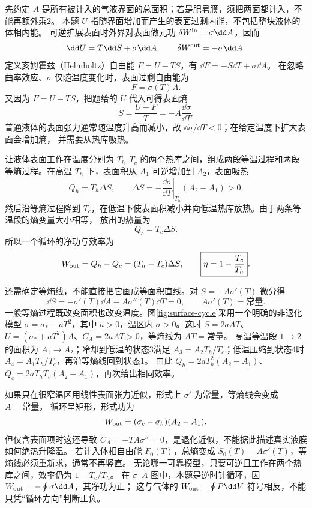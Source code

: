 \begin{xesolution}
先约定 $A$ 是所有被计入的气液界面的总面积；若是肥皂膜，须把两面都计入，不能再额外乘2。
本题 $U$ 指随界面增加而产生的表面过剩内能，不包括整块液体的体相内能。
可逆扩展表面时外界对表面做元功 $\delta W^{\rm in}=\sigma\dd A$，因而
\[
 \dd U=T\dd S+\sigma\dd A,\qquad
 \delta W^{\rm out}=-\sigma\dd A.
\]
定义亥姆霍兹（Helmholtz）自由能 $F=U-TS$，有 $\dd F=-S\dd T+\sigma\dd A$。
在忽略曲率效应、$\sigma$ 仅随温度变化时，表面过剩自由能为
\[
  F=\sigma(T)A.
\]
又因为 $F=U-TS$，把题给的 $U$ 代入可得表面熵
\[
  S=\frac{U-F}{T}
  =-A\frac{\dd\sigma}{\dd T}.
\]
普通液体的表面张力通常随温度升高而减小，故 $\dd\sigma/\dd T<0$；在给定温度下扩大表面会增加熵，
并需要从热库吸热。

让液体表面工作在温度分别为 $T_h,T_c$ 的两个热库之间，组成两段等温过程和两段等熵过程。在高温
$T_h$ 下，表面积从 $A_1$ 可逆增加到 $A_2$，表面吸热
\[
  Q_h=T_h\Delta S,
  \qquad
  \Delta S=-\left.\frac{\dd\sigma}{\dd T}\right|_{T_h}(A_2-A_1)>0.
\]
然后沿等熵过程降到 $T_c$，在低温下使表面积减小并向低温热库放热。由于两条等温段的熵变量大小相等，
放出的热量为
\[
  Q_c=T_c\Delta S.
\]
所以一个循环的净功与效率为
\[
  W_{\rm out}=Q_h-Q_c=(T_h-T_c)\Delta S,
  \qquad
  \boxed{\eta=1-\frac{T_c}{T_h}}.
\]

\surfaceEngineDiagram
{}\label{fig:surface-cycle}

还需确定等熵线，不能直接把它画成等面积直线。对 $S=-A\sigma'(T)$ 微分得
\[
 \dd S=-\sigma'(T)\dd A-A\sigma''(T)\dd T=0,
 \qquad A\sigma'(T)=\text{常量}.
\]
一般等熵过程既改变面积也改变温度。图\ref{fig:surface-cycle}采用一个明确的非退化模型
$\sigma=\sigma_*-aT^2$，其中 $a>0$，温区内 $\sigma>0$。这时
$S=2aAT$、$U=(\sigma_*+aT^2)A$、$C_A=2aAT>0$，等熵线为 $AT=\text{常量}$。
高温等温段 $1\to2$ 的面积为 $A_1\to A_2$；冷却到低温的状态3满足
$A_3=A_2T_h/T_c$；低温压缩到状态4时 $A_4=A_1T_h/T_c$，再沿等熵线回到状态1。
由此 $Q_h=2aT_h^2(A_2-A_1)$、$Q_c=2aT_hT_c(A_2-A_1)$，再次给出相同效率。

如果只在很窄温区用线性表面张力近似，形式上 $\sigma'$ 为常量，等熵线会变成 $A=\text{常量}$，
循环呈矩形，形式功为
\[
  W_{\rm out}=(\sigma_c-\sigma_h)(A_2-A_1).
\]
但仅含表面项时这还导致 $C_A=-TA\sigma''=0$，是退化近似，不能据此描述真实液膜如何绝热升降温。
若计入体相自由能 $F_0(T)$，总熵变成 $S_0(T)-A\sigma'(T)$，等熵线必须重新求，通常不再竖直。
无论哪一可靠模型，只要可逆且工作在两个热库之间，效率仍为 $1-T_c/T_h$。
在 $\sigma$--$A$ 图中，本题是逆时针循环，因 $W_{\rm out}=-\oint\sigma\dd A$，其净功为正；
这与气体的 $W_{\rm out}=\oint P\dd V$ 符号相反，不能只凭“循环方向”判断正负。
\end{xesolution}
